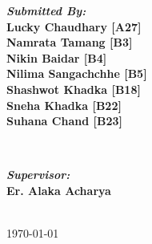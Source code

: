 \begin{titlepage}
\begin{center}
    \begin{minipage}{0.4\textwidth}
      \begin{flushleft}
        \textbf{\Large \textit{ Submitted By: } \\[0.3cm]
        Lucky Chaudhary [A27]   \\
        Namrata Tamang [B3]     \\
        Nikin Baidar [B4]       \\
        Nilima Sangachchhe [B5] \\
        Shashwot Khadka [B18]   \\
        Sneha Khadka [B22]      \\[2.2mm]
        Suhana Chand [B23]
        } \\ [1cm]
      \end{flushleft}
    \end{minipage}
    ~
    \begin{minipage}{0.4\textwidth}
      \begin{flushright}
        \vspace{-135pt}
        \textbf{\Large \textit{Supervisor:} \\[0.3cm]
        Er. Alaka Acharya \\
        }
      \end{flushright}
    \end{minipage}\\[2cm]

    \vfill
    \enlargethispage{\baselineskip}
    { \Large \today}

  \end{center}

\end{titlepage}
